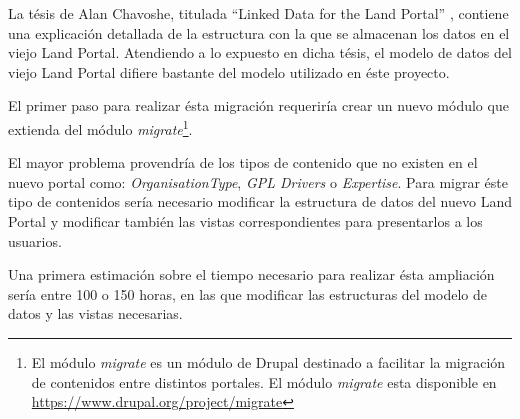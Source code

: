 	La tésis de Alan Chavoshe, titulada ``Linked Data for the Land Portal''
	\cite{lod_landportal}, contiene una explicación detallada de la estructura con la
	que se almacenan los datos en el viejo Land Portal.	Atendiendo a lo expuesto 
	en dicha tésis, el modelo de datos del viejo Land Portal difiere bastante
	del modelo utilizado en éste proyecto.  
	
	El primer paso para realizar ésta migración requeriría crear un nuevo módulo
	que extienda del módulo \textit{migrate}\footnote{El módulo \textit{migrate}
	es un módulo de Drupal destinado a facilitar la migración de contenidos 
	entre distintos portales.  El módulo \textit{migrate} esta disponible en
	\url{https://www.drupal.org/project/migrate}}.
	
	El mayor problema provendría de los tipos de contenido que no existen en 
	el nuevo portal como:  \textit{OrganisationType}, \textit{GPL Drivers} o
	\textit{Expertise}.  Para migrar éste tipo de contenidos sería necesario
	modificar la estructura de datos del nuevo Land Portal y modificar también
	las vistas correspondientes para presentarlos a los usuarios.
	
	Una primera estimación sobre el tiempo necesario para realizar ésta ampliación
	sería entre 100 o 150 horas, en las que modificar las estructuras del modelo
	de datos y las vistas necesarias.
	
